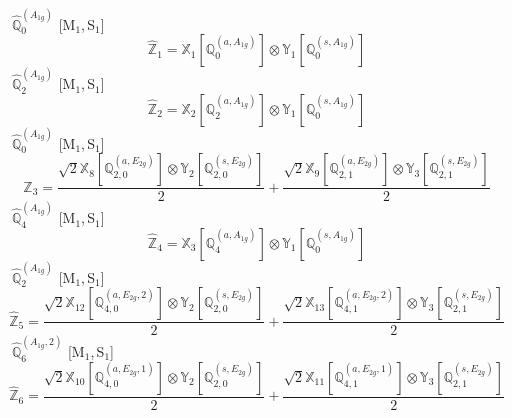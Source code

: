 \documentclass[fleqn,10pt,landscape]{article}
\begin{document}
\begin{itemize}
\vspace{4mm}
\noindent {} $\,\,\,\hat{\mathbb{Q}}_{0}^{(A_{1g})}$ [M$_{1}$,\,S$_{1}$]
\begin{dmath*}
\hat{\mathbb{Z}}_{1}=\mathbb{X}_{1}[\mathbb{Q}_{0}^{(a,A_{1g})}] \otimes\mathbb{Y}_{1}[\mathbb{Q}_{0}^{(s,A_{1g})}]
\end{dmath*}
\vspace{4mm}
\noindent {} $\,\,\,\hat{\mathbb{Q}}_{2}^{(A_{1g})}$ [M$_{1}$,\,S$_{1}$]
\begin{dmath*}
\hat{\mathbb{Z}}_{2}=\mathbb{X}_{2}[\mathbb{Q}_{2}^{(a,A_{1g})}] \otimes\mathbb{Y}_{1}[\mathbb{Q}_{0}^{(s,A_{1g})}]
\end{dmath*}
\vspace{4mm}
\noindent {} $\,\,\,\hat{\mathbb{Q}}_{0}^{(A_{1g})}$ [M$_{1}$,\,S$_{1}$]
\begin{dmath*}
\hat{\mathbb{Z}}_{3}=\frac{\sqrt{2} \mathbb{X}_{8}[\mathbb{Q}_{2,0}^{(a,E_{2g})}] \otimes\mathbb{Y}_{2}[\mathbb{Q}_{2,0}^{(s,E_{2g})}]}{2} + \frac{\sqrt{2} \mathbb{X}_{9}[\mathbb{Q}_{2,1}^{(a,E_{2g})}] \otimes\mathbb{Y}_{3}[\mathbb{Q}_{2,1}^{(s,E_{2g})}]}{2}
\end{dmath*}
\vspace{4mm}
\noindent {} $\,\,\,\hat{\mathbb{Q}}_{4}^{(A_{1g})}$ [M$_{1}$,\,S$_{1}$]
\begin{dmath*}
\hat{\mathbb{Z}}_{4}=\mathbb{X}_{3}[\mathbb{Q}_{4}^{(a,A_{1g})}] \otimes\mathbb{Y}_{1}[\mathbb{Q}_{0}^{(s,A_{1g})}]
\end{dmath*}
\vspace{4mm}
\noindent {} $\,\,\,\hat{\mathbb{Q}}_{2}^{(A_{1g})}$ [M$_{1}$,\,S$_{1}$]
\begin{dmath*}
\hat{\mathbb{Z}}_{5}=\frac{\sqrt{2} \mathbb{X}_{12}[\mathbb{Q}_{4,0}^{(a,E_{2g},2)}] \otimes\mathbb{Y}_{2}[\mathbb{Q}_{2,0}^{(s,E_{2g})}]}{2} + \frac{\sqrt{2} \mathbb{X}_{13}[\mathbb{Q}_{4,1}^{(a,E_{2g},2)}] \otimes\mathbb{Y}_{3}[\mathbb{Q}_{2,1}^{(s,E_{2g})}]}{2}
\end{dmath*}
\vspace{4mm}
\noindent {} $\,\,\,\hat{\mathbb{Q}}_{6}^{(A_{1g},2)}$ [M$_{1}$,\,S$_{1}$]
\begin{dmath*}
\hat{\mathbb{Z}}_{6}=\frac{\sqrt{2} \mathbb{X}_{10}[\mathbb{Q}_{4,0}^{(a,E_{2g},1)}] \otimes\mathbb{Y}_{2}[\mathbb{Q}_{2,0}^{(s,E_{2g})}]}{2} + \frac{\sqrt{2} \mathbb{X}_{11}[\mathbb{Q}_{4,1}^{(a,E_{2g},1)}] \otimes\mathbb{Y}_{3}[\mathbb{Q}_{2,1}^{(s,E_{2g})}]}{2}
\end{dmath*}

\end{itemize}
\end{document}
